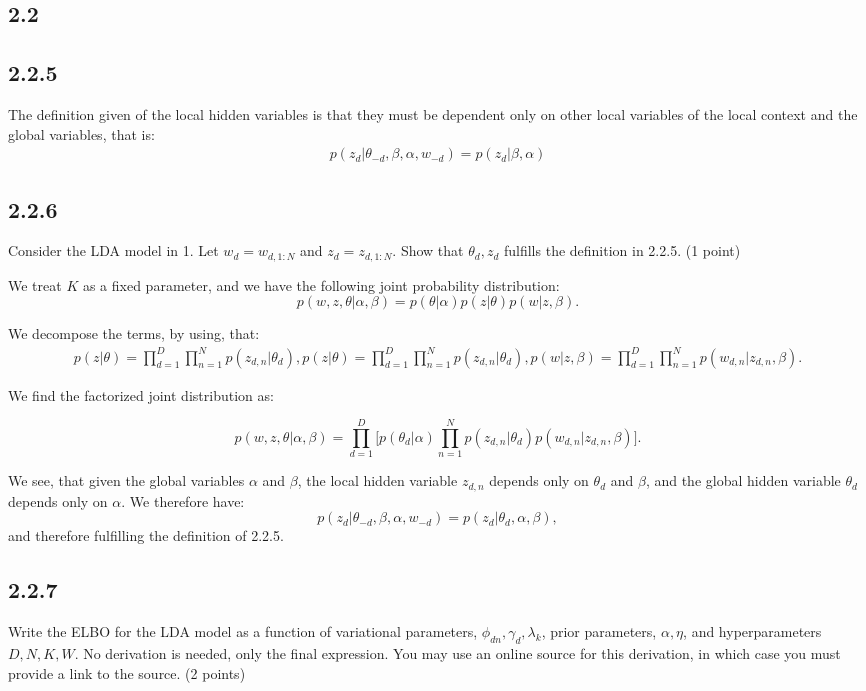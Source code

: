 \documentclass{article}
\begin{document}
\begin{multicols}{2}
    \section*{2.2}
    \subsection*{2.2.5} 
    The definition given of the local hidden variables is that they must be dependent
    only on other local variables of the local context and the global variables, that is:
    \begin{align}
        p(z_{d}|\theta_{-d}, \beta, \alpha, w_{-d}) = p(z_{d} | \beta, \alpha)
    \end{align}
    \subsection*{2.2.6}
    Consider the LDA model in 1. Let \(w_d = w_{d,1:N}\) and \(z_d = z_{d,1:N}\). Show that \(\theta_d, z_d\) fulfills the definition in 2.2.5. (1 point)\bigskip

    We treat $K$ as a fixed parameter, and we have the following joint probability distribution:
    \[
    p(w, z, \theta | \alpha, \beta) = p(\theta | \alpha) p(z | \theta) p(w | z, \beta).
    \]

    We decompose the terms, by using, that:
    \begin{align*}
    p(z | \theta) = \prod_{d=1}^D \prod_{n=1}^N p(z_{d,n} | \theta_d),
    p(z | \theta) = \prod_{d=1}^D \prod_{n=1}^N p(z_{d,n} | \theta_d),
    p(w | z, \beta) = \prod_{d=1}^D \prod_{n=1}^N p(w_{d,n} | z_{d,n}, \beta).
    \end{align*}

    We find the factorized joint distribution as:

    \[
    p(w, z, \theta | \alpha, \beta) = \prod_{d=1}^D \Big[ p(\theta_d | \alpha) \prod_{n=1}^N p(z_{d,n} | \theta_d) p(w_{d,n} | z_{d,n}, \beta) \Big].
    \]

    We see, that given the global variables $\alpha$ and $\beta$, the local hidden variable $z_{d,n}$ depends only on $\theta_d$ and $\beta$, and the global hidden variable $\theta_d$ depends only on $\alpha$.
    We therefore have:
    \[
    p(z_{d} |\theta_{-d}, \beta, \alpha, w_{-d}) = p(z_{d} |\theta_d, \alpha, \beta),
    \]
    and therefore fulfilling the definition of 2.2.5.





\subsection*{2.2.7}
Write the ELBO for the LDA model as a function of variational parameters, \(\phi_{dn}, \gamma_d, \lambda_k\), prior parameters, \(\alpha, \eta\), and hyperparameters \(D, N, K, W\). No derivation is needed, only the final expression. You may use an online source for this derivation, in which case you must provide a link to the source. (2 points)\bigskip


\end{multicols}
\end{document}
